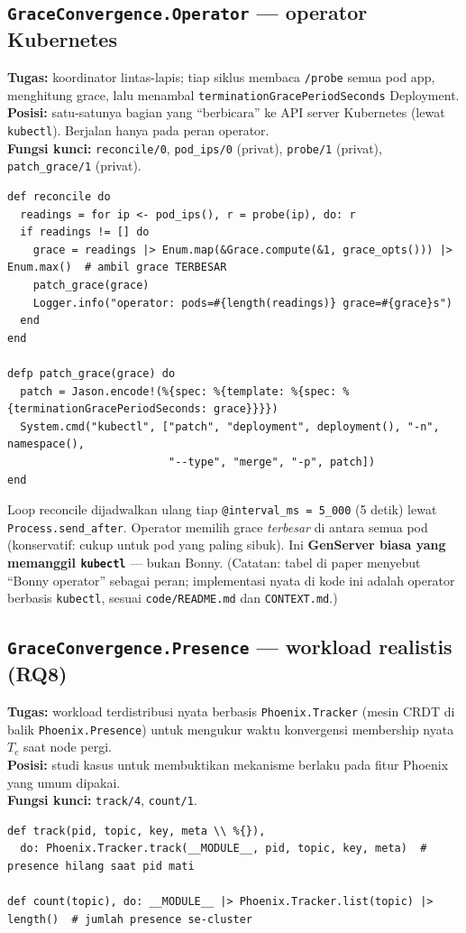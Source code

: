 \documentclass[11pt]{article}
\newcommand{\code}[1]{\texttt{\small #1}}
\begin{document}
\subsection{\texttt{GraceConvergence.Operator} --- operator Kubernetes}
\textbf{Tugas:} koordinator lintas-lapis; tiap siklus membaca \code{/probe} semua pod app, menghitung
grace, lalu menambal \code{terminationGracePeriodSeconds} Deployment. \\
\textbf{Posisi:} satu-satunya bagian yang ``berbicara'' ke API server Kubernetes (lewat \code{kubectl}).
Berjalan hanya pada peran operator. \\
\textbf{Fungsi kunci:} \code{reconcile/0}, \code{pod\_ips/0} (privat), \code{probe/1} (privat),
\code{patch\_grace/1} (privat).
\begin{lstlisting}[style=ex]
def reconcile do
  readings = for ip <- pod_ips(), r = probe(ip), do: r
  if readings != [] do
    grace = readings |> Enum.map(&Grace.compute(&1, grace_opts())) |> Enum.max()  # ambil grace TERBESAR
    patch_grace(grace)
    Logger.info("operator: pods=#{length(readings)} grace=#{grace}s")
  end
end

defp patch_grace(grace) do
  patch = Jason.encode!(%{spec: %{template: %{spec: %{terminationGracePeriodSeconds: grace}}}})
  System.cmd("kubectl", ["patch", "deployment", deployment(), "-n", namespace(),
                         "--type", "merge", "-p", patch])
end
\end{lstlisting}
Loop reconcile dijadwalkan ulang tiap \code{@interval\_ms = 5\_000} (5 detik) lewat
\code{Process.send\_after}. Operator memilih grace \emph{terbesar} di antara semua pod (konservatif:
cukup untuk pod yang paling sibuk). Ini \textbf{GenServer biasa yang memanggil \code{kubectl}} ---
bukan Bonny. (Catatan: tabel di paper menyebut ``Bonny operator'' sebagai peran; implementasi nyata di
kode ini adalah operator berbasis \code{kubectl}, sesuai \code{code/README.md} dan \code{CONTEXT.md}.)

\subsection{\texttt{GraceConvergence.Presence} --- workload realistis (RQ8)}
\textbf{Tugas:} workload terdistribusi nyata berbasis \code{Phoenix.Tracker} (mesin CRDT di balik
\code{Phoenix.Presence}) untuk mengukur waktu konvergensi membership nyata $T_c$ saat node pergi. \\
\textbf{Posisi:} studi kasus untuk membuktikan mekanisme berlaku pada fitur Phoenix yang umum dipakai.
\\
\textbf{Fungsi kunci:} \code{track/4}, \code{count/1}.
\begin{lstlisting}[style=ex]
def track(pid, topic, key, meta \\ %{}),
  do: Phoenix.Tracker.track(__MODULE__, pid, topic, key, meta)  # presence hilang saat pid mati

def count(topic), do: __MODULE__ |> Phoenix.Tracker.list(topic) |> length()  # jumlah presence se-cluster
\end{lstlisting}
\end{document}

